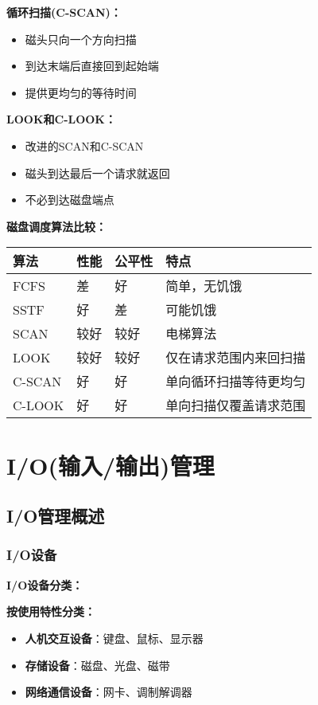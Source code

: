 \documentclass[lang=cn,newtx,10pt,scheme=chinese]{../../elegantbook}
\begin{document}
\textbf{循环扫描(C-SCAN)：}
\begin{itemize}
  \item 磁头只向一个方向扫描
  \item 到达末端后直接回到起始端
  \item 提供更均匀的等待时间
\end{itemize}

\textbf{LOOK和C-LOOK：}
\begin{itemize}
  \item 改进的SCAN和C-SCAN
  \item 磁头到达最后一个请求就返回
  \item 不必到达磁盘端点
\end{itemize}

\textbf{磁盘调度算法比较：}
\begin{longtable}{@{}p{3cm}p{3cm}p{3cm}p{4cm}@{}}
\toprule
\textbf{算法} & \textbf{性能} & \textbf{公平性} & \textbf{特点} \\ \midrule
\endhead
FCFS & 差 & 好 & 简单，无饥饿 \\
SSTF & 好 & 差 & 可能饥饿 \\
SCAN & 较好 & 较好 & 电梯算法 \\
LOOK & 较好 & 较好 & 仅在请求范围内来回扫描 \\
C-SCAN & 好 & 好 & 单向循环扫描等待更均匀 \\
C-LOOK & 好 & 好 & 单向扫描仅覆盖请求范围 \\
\bottomrule
\end{longtable}

\chapter{I/O(输入/输出)管理}


\section{I/O管理概述}

\subsection{I/O设备}

\textbf{I/O设备分类：}

\textbf{按使用特性分类：}
\begin{itemize}
  \item \textbf{人机交互设备}：键盘、鼠标、显示器
  \item \textbf{存储设备}：磁盘、光盘、磁带
  \item \textbf{网络通信设备}：网卡、调制解调器
\end{itemize}
\end{document}
